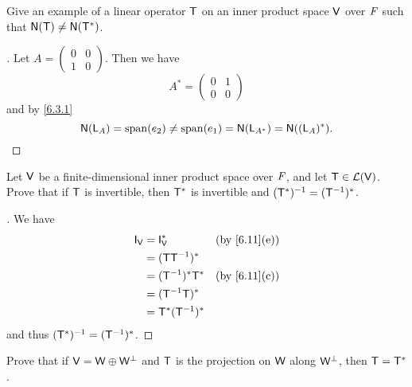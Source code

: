 \begin{ex}\label{ex:6.3.7}
	Give an example of a linear operator \(\mathsf{T}\) on an inner product space \(\mathsf{V}\) over \(\mathit{F}\) such that \(\ns{\T} \neq \ns{\T^*}\).
\end{ex}

\begin{proof}[]
	Let \(A = \begin{pmatrix}
		0 & 0 \\
		1 & 0
	\end{pmatrix}\).
	Then we have
	\[
		A^* = \begin{pmatrix}
			0 & 1 \\
			0 & 0
		\end{pmatrix}
	\]
	and by \cref{6.3.1}
	\[
		\ns{\L_A} = \spn{e_2} \neq \spn{e_1} = \ns{\L_{A^*}} = \ns{(\L_A)^*}.
	\]
\end{proof}

\begin{ex}\label{ex:6.3.8}
	Let \(\mathsf{V}\) be a finite-dimensional inner product space over \(\mathit{F}\), and let \(\mathsf{T} \in \mathcal{L}(\mathsf{V})\).
	Prove that if \(\mathsf{T}\) is invertible, then \(\mathsf{T}^*\) is invertible and \((\mathsf{T}^*)^{-1} = (\mathsf{T}^{-1})^*\).
\end{ex}

\begin{proof}[]
	We have
	\begin{align*}
		\IT[\V] & = \IT[\V]^*        &  & \by{6.11}[e] \\
		        & = (\T \T^{-1})^*                     \\
		        & = (\T^{-1})^* \T^* &  & \by{6.11}[c] \\
		        & = (\T^{-1} \T)^*                     \\
		        & = \T^* (\T^{-1})^*
	\end{align*}
	and thus \((\mathsf{T}^*)^{-1} = (\mathsf{T}^{-1})^*\).
\end{proof}

\begin{ex}\label{ex:6.3.9}
	Prove that if \(\mathsf{V} = \mathsf{W} \oplus \mathsf{W}^{\perp}\) and \(\mathsf{T}\) is the projection on \(\mathsf{W}\) along \(\mathsf{W}^{\perp}\), then \(\mathsf{T} = \mathsf{T}^*\).
\end{ex}


